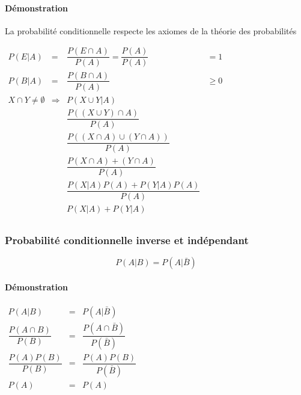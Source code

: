 \paragraph{Démonstration}
La probabilité conditionnelle respecte les axiomes de la théorie des probabilités
\begin{center}
	$\begin{array}{LCCL}
		P(E|A) &=& \dfrac{P(E\cap A)}{P(A)} = \dfrac{P(A)}{P(A)}&=1\\
		P(B|A) &=& \dfrac{P(B\cap A)}{P(A)}&\geq0\\
		X\cap Y\neq\emptyset &\Rightarrow& P(X\cup Y |A)\\
		&&\dfrac{P((X\cup Y)\cap A)}{P(A)}\\
		&&\dfrac{P((X\cap A)\cup (Y\cap A))}{P(A)}\\
		&&\dfrac{P(X\cap A) + (Y\cap A)}{P(A)}\\
		&&\dfrac{P(X|A)P(A) + P(Y|A)P(A)}{P(A)}\\
		&&P(X|A) + P(Y|A)\\
	\end{array}$
\end{center}






\subsubsection{Probabilité conditionnelle inverse et indépendant}
$$P(A|B) = P(A|\bar{B})$$
\paragraph{Démonstration}
\begin{center}
	$\begin{array}{CCC}
		P(A|B)                   &=& P(A|\bar{B})\\
		\dfrac{P(A\cap B)}{P(B)} &=& \dfrac{P(A\cap\bar{B})}{P(\bar{B})}\\
		\dfrac{P(A) P(B)}{P(B)}  &=& \dfrac{P(A)P(B)}{P(\bar{B})}\\
		P(A)                     &=& P(A)\\
	\end{array}$
\end{center}








